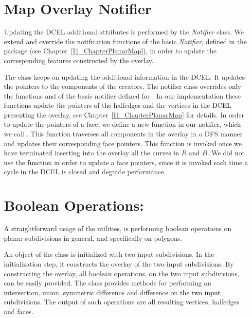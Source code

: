 \begin{ccTexOnly}
\section{Map Overlay Notifier}
\label{sec:notifier}
Updating the DCEL additional attributes is performed by the {\em Notifier} class.
We extend and override the notification functions of the basic {\em Notifier}, 
defined in the  package 
(see Chapter~\ref{I1_ChapterPlanarMap}), 
in order to update the corresponding features constructed by the overlay. 

The  class 
keeps on updating the additional information in the DCEL.
It updates the pointers to the components of the creators.
The notifier class overrides only the functions  
and  of the basic notifier defined for .
In our implementation these functions update 
the pointers of the halfedges and the vertices in the DCEL 
presenting the overlay, see Chapter~\ref{I1_ChapterPlanarMap} for details.
In order to update the pointers of a face, we define a new function in our 
notifier, which we call . 
This function traverses all components in the overlay in a DFS manner and 
updates their corresponding face pointers. 
This function is invoked once we have terminated 
inserting into the overlay all the curves in $R$ and $B$.
We did not use the  function in order to update a 
face pointers, since it is invoked each time a cycle in the DCEL 
is closed and degrade performance. 

\section{Boolean Operations:}
A straightforward usage of the  
utilities, is performing boolean operations on planar subdivisions in general, 
and specifically on polygons.

An object of the  class is initialized with 
two input subdivisions. In the initialization step, it constructs the overlay 
of the two input subdivisions. By constructing the overlay, all boolean operations, 
on the two input subdivisions, can be easily provided.
The   class provides methods for 
performing an intersection, union, symmetric difference and difference on the two 
input subdivisions. 
The output of such operations are all resulting vertices, halfedges and faces.


\end{ccTexOnly}
